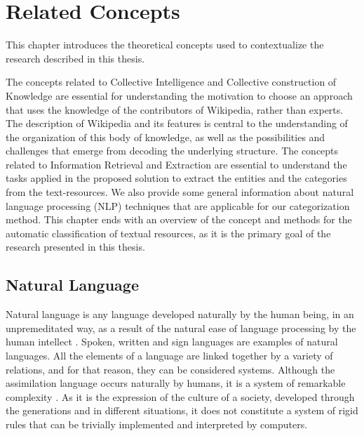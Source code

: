 \chapter{\hspace*{3pt} Related Concepts}
\label{chapter:related-concepts}



This chapter introduces the theoretical concepts used to contextualize the research described in this thesis.

The concepts related to Collective Intelligence and Collective construction of Knowledge are essential for understanding the motivation to choose an approach that uses the knowledge of the contributors of Wikipedia, rather than experts. The description of Wikipedia and its features is central to the understanding of the organization of this body of knowledge, as well as the possibilities and challenges that emerge from decoding  the underlying structure. 
The concepts related to Information Retrieval and Extraction are essential to understand the tasks applied in the proposed solution to extract the entities and the categories from the text-resources.
We also provide some general information about natural language processing (NLP) techniques that are applicable for our categorization method. 
This chapter ends with an overview of the concept and methods for the automatic classification of textual resources, as it is the primary goal of the research presented in this thesis. 

\section{\hspace*{3pt}Natural Language}

Natural language is any language developed naturally by the human being, in an unpremeditated way, as a result of the natural ease of language processing by the human intellect \cite{chomsky1975logical}. Spoken, written and sign languages are examples of natural languages. 
All the elements of a language are linked together by a variety of relations, and for that reason, they can be considered systems. Although the assimilation language occurs naturally by humans, it is a system of remarkable complexity \cite{chomsky1975logical}. 
As it is the expression of the culture of a society, developed through the generations and in different situations, it does not constitute a system of rigid rules that can be trivially implemented and interpreted by computers.


